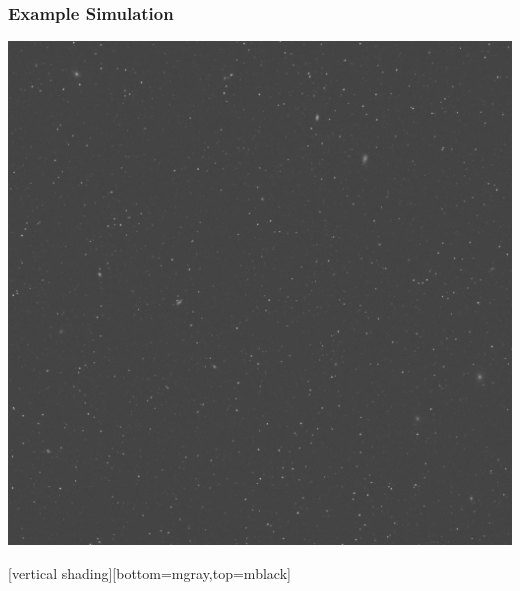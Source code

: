 \documentclass{beamer}
\begin{document}
{

    \frame
    {
        \frametitle{Example Simulation}
     
        \begin{center}
            \includegraphics[width=1.6\textwidth]{nbrsim-003e-000023-image.jpg}
            \newline
        \end{center}

    }
    [vertical shading][bottom=mgray,top=mblack]

}
\end{document}
